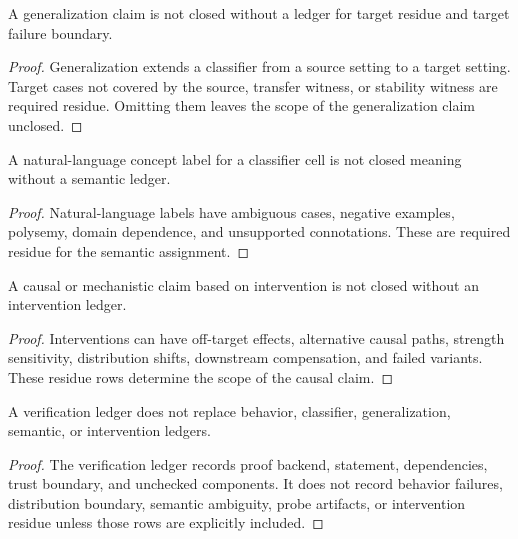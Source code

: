 \begin{theorem}
\label{thm:philosophy-generalization-requires-target-residue-ledger}
A generalization claim is not closed without a ledger for target residue
and target failure boundary.
\end{theorem}
\begin{proof}
Generalization extends a classifier from a source setting to a target
setting. Target cases not covered by the source, transfer witness, or
stability witness are required residue. Omitting them leaves the scope of
the generalization claim unclosed.
\end{proof}

\begin{theorem}
\label{thm:philosophy-semantic-labels-require-semantic-ledger}
A natural-language concept label for a classifier cell is not closed
meaning without a semantic ledger.
\end{theorem}
\begin{proof}
Natural-language labels have ambiguous cases, negative examples,
polysemy, domain dependence, and unsupported connotations. These are
required residue for the semantic assignment.
\end{proof}

\begin{theorem}
\label{thm:philosophy-causal-explanations-require-intervention-ledger}
A causal or mechanistic claim based on intervention is not closed without
an intervention ledger.
\end{theorem}
\begin{proof}
Interventions can have off-target effects, alternative causal paths,
strength sensitivity, distribution shifts, downstream compensation, and
failed variants. These residue rows determine the scope of the causal
claim.
\end{proof}

\begin{theorem}
\label{thm:philosophy-verification-ledger-not-behavior-ledger}
A verification ledger does not replace behavior, classifier,
generalization, semantic, or intervention ledgers.
\end{theorem}
\begin{proof}
The verification ledger records proof backend, statement, dependencies,
trust boundary, and unchecked components. It does not record behavior
failures, distribution boundary, semantic ambiguity, probe artifacts, or
intervention residue unless those rows are explicitly included.
\end{proof}

